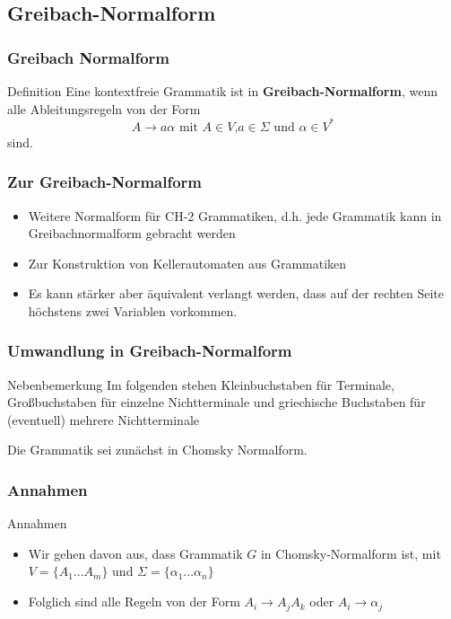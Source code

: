 \documentclass{beamer}
\begin{document}
{%
\subsection{Greibach-Normalform}
\begin{frame}
\frametitle{Greibach Normalform}
\begin{exampleblock}{Definition}
Eine kontextfreie Grammatik ist in \textbf{Greibach-Normalform}, wenn alle Ableitungsregeln von der Form 
$$ A \rightarrow a\alpha \text{ mit } A \in V\text{,} a\in \Sigma \text{ und } \alpha \in V^*$$
sind.
\end{exampleblock}
\end{frame}

\begin{frame}
\frametitle{Zur Greibach-Normalform}
\begin{itemize}
\item Weitere Normalform für CH-2 Grammatiken, d.h. jede Grammatik kann in Greibachnormalform gebracht werden
\item Zur Konstruktion von Kellerautomaten aus Grammatiken
\item Es kann stärker aber äquivalent verlangt werden, dass auf der rechten Seite höchstens zwei Variablen vorkommen.
\end{itemize}
\end{frame}

\begin{frame}
\frametitle{Umwandlung in Greibach-Normalform}
\begin{exampleblock}{Nebenbemerkung}
Im folgenden stehen Kleinbuchstaben für Terminale, Großbuchstaben für einzelne Nichtterminale und griechische Buchstaben für (eventuell) mehrere Nichtterminale 
\end{exampleblock}
Die Grammatik sei zunächst in Chomsky Normalform.
\end{frame}

\begin{frame}
\frametitle{Annahmen}
\begin{block}{Annahmen}
\begin{itemize}
 \item Wir gehen davon aus, dass Grammatik $G$ in Chomsky-Normalform ist, mit $V = \{A_1 ... A_m \}$ und $\Sigma = \{\alpha_1 ... \alpha_n\}$
 \item Folglich sind alle Regeln von der Form $A_i \rightarrow A_jA_k$ oder $A_i \rightarrow \alpha_j$
\end{itemize}
\end{block}
\end{frame}

}
\end{document}
